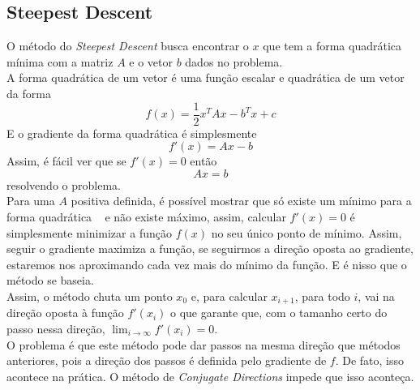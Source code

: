 \documentclass[
10pt, %
a4paper, %
oneside, %
headinclude,footinclude, %
BCOR5mm, %
]{scrartcl}
\begin{document}
\subsection{Steepest Descent}
O método do \textit{Steepest Descent} busca encontrar o $x$ que tem a forma quadrática mínima com a matriz $A$ e o vetor $b$ dados no problema. \\
A forma quadrática de um vetor é uma função escalar e quadrática de um vetor da forma ~\cite[p.~2]{shewchuk1994introduction}
$$ f(x) = \frac{1}{2}x^{T}Ax - b^{T}x + c $$ 
E o gradiente da forma quadrática é simplesmente ~\cite[p.~3]{shewchuk1994introduction}
$$ f'(x) = Ax - b $$ 
Assim, é fácil ver que se $ f'(x) = 0 $ então
$$ Ax = b $$
resolvendo o problema. \\
Para uma $A$ positiva definida, é possível mostrar que só existe um mínimo para a forma quadrática ~\cite[p.~5]{shewchuk1994introduction} e não existe máximo, assim, calcular $f'(x) = 0$ é simplesmente minimizar a função $f(x)$ no seu único ponto de mínimo. Assim, seguir o gradiente maximiza a função, se seguirmos a direção oposta ao gradiente, estaremos nos aproximando cada vez mais do mínimo da função. E é nisso que o método se baseia. \\
Assim, o método chuta um ponto $x_0$ e, para calcular $x_{i+1}$, para todo $i$, vai na direção oposta à função $f'(x_i)$ o que garante que, com o tamanho certo do passo nessa direção, $\lim_{i \to \infty} f'(x_i) = 0$. \\
O problema é que este método pode dar passos na mesma direção que métodos anteriores, pois a direção dos passos é definida pelo gradiente de $f$. De fato, isso acontece na prática. O método de \textit{Conjugate Directions} impede que isso aconteça.
\end{document}
